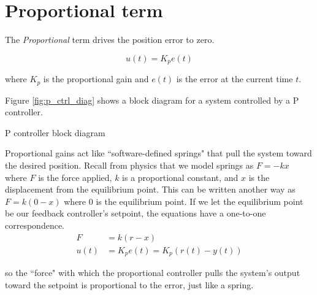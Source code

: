 \section{Proportional term}

The \textit{Proportional} term drives the position error to zero.
\begin{definition}
  \begin{equation}
    u(t) = K_p e(t)
  \end{equation}

  where $K_p$ is the proportional gain and $e(t)$ is the error at the current
  time $t$.
\end{definition}

Figure \ref{fig:p_ctrl_diag} shows a block diagram for a \gls{system}
controlled by a P controller.
\begin{bookfigure}

  \caption{P controller block diagram}
  \label{fig:p_ctrl_diag}
\end{bookfigure}

Proportional gains act like ``software-defined springs" that pull the
\gls{system} toward the desired position. Recall from physics that we model
springs as $F = -kx$ where $F$ is the force applied, $k$ is a proportional
constant, and $x$ is the displacement from the equilibrium point. This can be
written another way as $F = k(0 - x)$ where $0$ is the equilibrium point.
If we let the equilibrium point be our feedback controller's \gls{setpoint}, the
equations have a one-to-one correspondence.
\begin{align*}
  F &= k(r - x) \\
  u(t) &= K_p e(t) = K_p(r(t) - y(t))
\end{align*}

so the ``force" with which the proportional controller pulls the \gls{system}'s
\gls{output} toward the \gls{setpoint} is proportional to the \gls{error}, just
like a spring.
